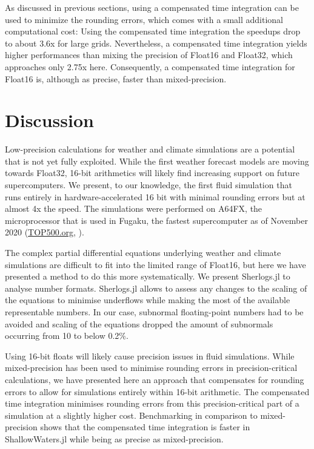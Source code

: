 As discussed in previous sections, using a compensated time integration can be used to minimize the rounding errors,
which comes with a small additional computational cost: Using the compensated time integration the speedups drop to
about 3.6x for large grids. Nevertheless, a compensated time integration yields higher performances than mixing the
precision of Float16 and Float32, which approaches only 2.75x here. Consequently, a compensated time integration
for Float16 is, although as precise, faster than mixed-precision.

\section{Discussion}
\label{sec:hardware_discussion}

Low-precision calculations for weather and climate simulations are a potential that is not yet fully exploited.
While the first weather forecast models are moving towards Float32, 16-bit arithmetics will likely find increasing
support on future supercomputers. We present, to our knowledge, the first fluid simulation that runs entirely in
hardware-accelerated 16 bit with minimal rounding errors but at almost 4x the speed. The simulations were
performed on A64FX, the microprocessor that is used in Fugaku, the fastest supercomputer as of November
2020 (\href{https://top500.org}{TOP500.org}, \cite{Dongarra2011}).

The complex partial differential equations underlying weather and climate simulations are difficult to fit into the
limited range of Float16, but here we have presented a method to do this more systematically. We present 
Sherlogs.jl to analyse number formats. Sherlogs.jl allows to assess any changes to the scaling of the equations
to minimise underflows while making the most of the available representable numbers. In our case,
subnormal floating-point numbers had to be avoided and scaling of the equations dropped the amount of
subnormals occurring from 10 to below 0.2\%.

Using 16-bit floats will likely cause precision issues in fluid simulations. While mixed-precision has been
used to minimise rounding errors in precision-critical calculations, we have presented here an approach
that compensates for rounding errors to allow for simulations entirely within 16-bit arithmetic.
The compensated time integration minimises rounding errors from this precision-critical part of a simulation
at a slightly higher cost. Benchmarking in comparison to mixed-precision shows that the compensated
time integration is faster in ShallowWaters.jl while being as precise as mixed-precision.

